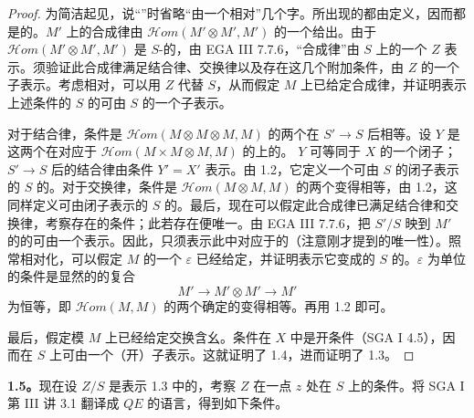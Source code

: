 \begin{proof}
为简洁起见，说“”时省略“由一个相对”几个字。所出现的都由定义，因而都是的。$M'$ 上的合成律由 $\mathcal H om(M'\otimes M',M')$ 的一个给出。由于 $\mathcal H om(M'\otimes M',M')$ 是 $S$-的，由 EGA III 7.7.6，“合成律”由 $S$ 上的一个 $Z$ 表示。须验证此合成律满足结合律、交换律以及存在这几个附加条件，由 $Z$ 的一个子表示。考虑相对，可以用 $Z$ 代替 $S$，从而假定 $M$ 上已给定合成律，并证明表示上述条件的 $S$ 的可由 $S$ 的一个子表示。

对于结合律，条件是 $\mathcal H om(M\otimes M\otimes M,M)$ 的两个在 $S'\to S$ 后相等。设 $Y$ 是这两个在对应于 $\mathcal H om(M\times M\otimes M,M)$ 的上的。 $Y$ 可等同于 $X$ 的一个闭子；$S'\to S$ 后的结合律由条件 $Y'=X'$ 表示。由 1.2，它定义一个可由 $S$ 的闭子表示的 $S$ 的。对于交换律，条件是 $\mathcal H om(M\otimes M,M)$ 的两个变得相等，由 1.2，这同样定义可由闭子表示的 $S$ 的。最后，现在可以假定此合成律已满足结合律和交换律，考察存在的条件；此若存在便唯一。由 EGA III 7.7.6，把 $S'/S$ 映到 $M'$ 的的可由一个表示。因此，只须表示此中对应于的（注意刚才提到的唯一性）。照常相对化，可以假定 $M$ 的一个 $\varepsilon$ 已经给定，并证明表示它变成的 $S$ 的。$\varepsilon$ 为单位的条件是显然的的复合
\[
M'\longrightarrow M'\otimes M'\longrightarrow M'
\]
为恒等，即 $\mathcal H om(M,M)$ 的两个确定的变得相等。再用 1.2 即可。

最后，假定模 $M$ 上已经给定交换含幺。条件在 $X$ 中是开条件（SGA I 4.5），因而在 $S$ 上可由一个（开）子表示。这就证明了 1.4，进而证明了 1.3。
\end{proof}
\textbf{1.5。}现在设 $Z/S$ 是表示 1.3 中的，考察 $Z$ 在一点 $z$ 处在 $S$ 上的条件。将 SGA I 第 III 讲 3.1 翻译成 $QE$ 的语言，得到如下条件。

